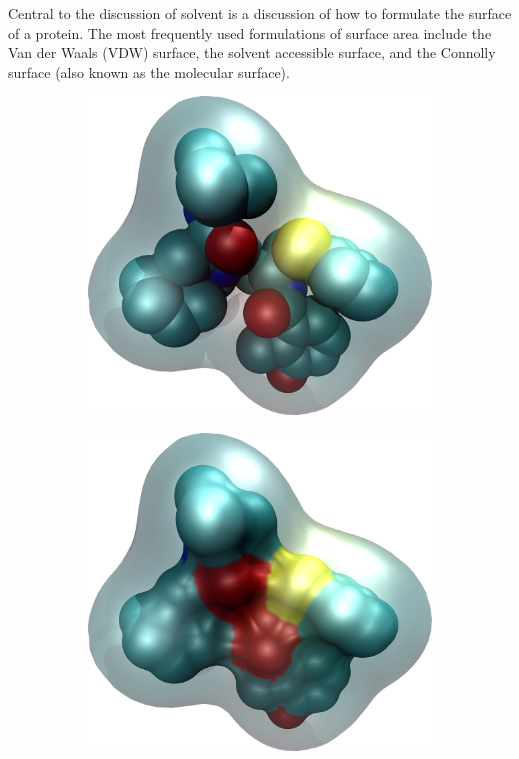 Central to the discussion of solvent is a discussion of how to formulate the surface of a protein.
The most frequently used formulations of surface area include the Van der Waals (VDW) surface, the solvent accessible surface, and the Connolly surface (also known as the molecular surface).
\begin{figure}[h]
\centering
\begin{subfigure}[b]{0.4\textwidth}
\centering
\includegraphics[width=\textwidth]{figures/vdw.png}
\caption{}
\label{figure:vdw_surface}
\end{subfigure}
\hspace{0.1\textwidth}
\begin{subfigure}[b]{0.4\textwidth}
\centering
\includegraphics[width=\textwidth]{figures/molecular.png}

\end{subfigure}
\end{figure}
